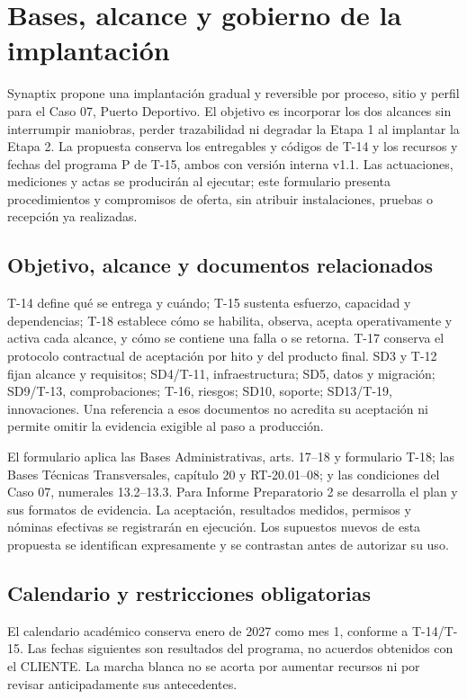 \section{Bases, alcance y gobierno de la implantación}\label{sec:t18-bases}
Synaptix propone una implantación gradual y reversible por proceso, sitio y perfil para el Caso 07, Puerto Deportivo. El objetivo es incorporar los dos alcances sin interrumpir maniobras, perder trazabilidad ni degradar la Etapa 1 al implantar la Etapa 2. La propuesta conserva los entregables y códigos de T-14 y los recursos y fechas del programa P de T-15, ambos con versión interna v1.1. Las actuaciones, mediciones y actas se producirán al ejecutar; este formulario presenta procedimientos y compromisos de oferta, sin atribuir instalaciones, pruebas o recepción ya realizadas.

\subsection{Objetivo, alcance y documentos relacionados}
T-14 define qué se entrega y cuándo; T-15 sustenta esfuerzo, capacidad y dependencias; T-18 establece cómo se habilita, observa, acepta operativamente y activa cada alcance, y cómo se contiene una falla o se retorna. T-17 conserva el protocolo contractual de aceptación por hito y del producto final. SD3 y T-12 fijan alcance y requisitos; SD4/T-11, infraestructura; SD5, datos y migración; SD9/T-13, comprobaciones; T-16, riesgos; SD10, soporte; SD13/T-19, innovaciones. Una referencia a esos documentos no acredita su aceptación ni permite omitir la evidencia exigible al paso a producción.

El formulario aplica las Bases Administrativas, arts. 17--18 y formulario T-18; las Bases Técnicas Transversales, capítulo 20 y RT-20.01--08; y las condiciones del Caso 07, numerales 13.2--13.3. Para Informe Preparatorio 2 se desarrolla el plan y sus formatos de evidencia. La aceptación, resultados medidos, permisos y nóminas efectivas se registrarán en ejecución. Los supuestos nuevos de esta propuesta se identifican expresamente y se contrastan antes de autorizar su uso.

\subsection{Calendario y restricciones obligatorias}
El calendario académico conserva enero de 2027 como mes 1, conforme a T-14/T-15. Las fechas siguientes son resultados del programa, no acuerdos obtenidos con el CLIENTE. La marcha blanca no se acorta por aumentar recursos ni por revisar anticipadamente sus antecedentes.

